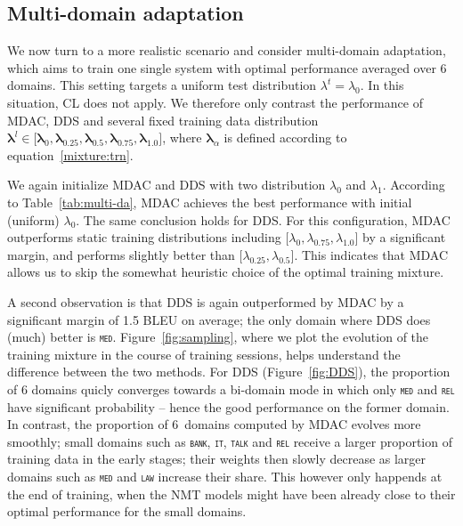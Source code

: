 \documentclass[11pt]{article}
\newcommand{\domain}[1]{\texttt{\textsc{#1}}}
\newcommand{\vlambda}{\ensuremath{\boldsymbol\lambda}\xspace} %
\begin{document}
\subsection{Multi-domain adaptation}\label{ssec:mda}

We now turn to a more realistic scenario and consider multi-domain adaptation, which aims to train one single system with optimal performance averaged over 6 domains. This setting targets a uniform test distribution $\lambda^t = \lambda_0$. In this situation, CL \citep{Zhang19curriculum} does not apply. We therefore only contrast the performance of MDAC, DDS and several fixed training data distribution $\vlambda^l \in \big[ \vlambda_0, \vlambda_{0.25}, \vlambda_{0.5}, \vlambda_{0.75}, \vlambda_{1.0}\big]$, where $\vlambda_{\alpha}$ is defined according to equation~\eqref{mixture:trn}.

We again initialize MDAC and DDS with two distribution $\lambda_0$ and $\lambda_1$. According to Table~\ref{tab:multi-da}, MDAC achieves the best performance with initial (uniform) $\lambda_0$. The same conclusion holds for DDS. For this configuration, MDAC outperforms static training distributions including $\big[ \lambda_0, \lambda_{0.75}, \lambda_{1.0}\big]$ by a significant margin, and performs slightly better than $\big[ \lambda_{0.25}, \lambda_{0.5} \big]$. This indicates that MDAC allows us to skip the somewhat heuristic choice of the optimal training mixture.

A second observation is that DDS is again outperformed by MDAC by a significant margin of 1.5 BLEU on average; the only domain where DDS does (much) better is \domain{med}. Figure~\ref{fig:sampling}, where we plot the evolution of the training mixture in the course of training sessions, helps understand the difference between the two methods. For DDS (Figure~\ref{fig:DDS}), the proportion of 6 domains quicly converges towards a bi-domain mode in which only \domain{med} and \domain{rel} have significant probability -- hence the good performance on the former domain. In contrast, the proportion of 6~domains computed by MDAC evolves more smoothly; small domains such as \domain{bank}, \domain{it}, \domain{talk} and \domain{rel} receive a larger proportion of training data in the early stages; their weights then slowly decrease as larger domains such as \domain{med} and \domain{law} increase their share. This however only happends at the end of training, when the NMT models might have been already close to their optimal performance for the small domains.
\end{document}
